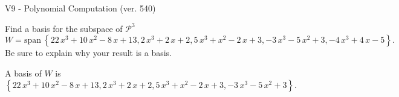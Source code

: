 \begin{exercise}
  \begin{exerciseTitle}V9 - Polynomial Computation (ver. 540)\end{exerciseTitle}
  \begin{exerciseStatement}
    Find a basis for the subspace of \(\mathcal{P}^3\) 
\[W=\mathrm{span}\ \left\{22 \, x^{3} + 10 \, x^{2} - 8 \, x + 13 , 2 \, x^{3} + 2 \, x + 2 , 5 \, x^{3} + x^{2} - 2 \, x + 3 , -3 \, x^{3} - 5 \, x^{2} + 3 , -4 \, x^{3} + 4 \, x - 5\right\}.\]
 Be sure to explain why your result is a basis.


  \end{exerciseStatement}
  \begin{exerciseAnswer}
   A basis of \(W\) is  \(\left\{22 \, x^{3} + 10 \, x^{2} - 8 \, x + 13 , 2 \, x^{3} + 2 \, x + 2 , 5 \, x^{3} + x^{2} - 2 \, x + 3 , -3 \, x^{3} - 5 \, x^{2} + 3\right\}\).
  


  \end{exerciseAnswer}
\end{exercise}